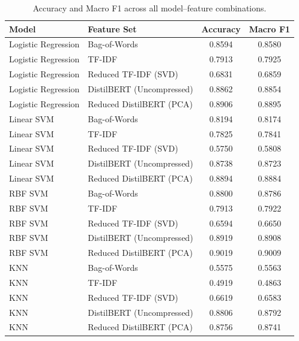 \begin{table}[H]
\centering
\caption{Accuracy and Macro F1 across all model--feature combinations.}
\label{tab:results}
\renewcommand{\arraystretch}{1.25}
\begin{tabular}{llcc}
\toprule
\textbf{Model} & \textbf{Feature Set} & \textbf{Accuracy} & \textbf{Macro F1} \\
\midrule
Logistic Regression & Bag-of-Words & 0.8594 & 0.8580 \\
Logistic Regression & TF-IDF & 0.7913 & 0.7925 \\
Logistic Regression & Reduced TF-IDF (SVD) & 0.6831 & 0.6859 \\
Logistic Regression & DistilBERT (Uncompressed) & 0.8862 & 0.8854 \\
Logistic Regression & Reduced DistilBERT (PCA) & 0.8906 & 0.8895 \\
\midrule
Linear SVM & Bag-of-Words & 0.8194 & 0.8174 \\
Linear SVM & TF-IDF & 0.7825 & 0.7841 \\
Linear SVM & Reduced TF-IDF (SVD) & 0.5750 & 0.5808 \\
Linear SVM & DistilBERT (Uncompressed) & 0.8738 & 0.8723 \\
Linear SVM & Reduced DistilBERT (PCA) & 0.8894 & 0.8884 \\
\midrule
RBF SVM & Bag-of-Words & 0.8800 & 0.8786 \\
RBF SVM & TF-IDF & 0.7913 & 0.7922 \\
RBF SVM & Reduced TF-IDF (SVD) & 0.6594 & 0.6650 \\
RBF SVM & DistilBERT (Uncompressed) & 0.8919 & 0.8908 \\
RBF SVM & Reduced DistilBERT (PCA) & 0.9019 & 0.9009 \\
\midrule
KNN & Bag-of-Words & 0.5575 & 0.5563 \\
KNN & TF-IDF & 0.4919 & 0.4863 \\
KNN & Reduced TF-IDF (SVD) & 0.6619 & 0.6583 \\
KNN & DistilBERT (Uncompressed) & 0.8806 & 0.8792 \\
KNN & Reduced DistilBERT (PCA) & 0.8756 & 0.8741 \\
\bottomrule
\end{tabular}
\end{table}